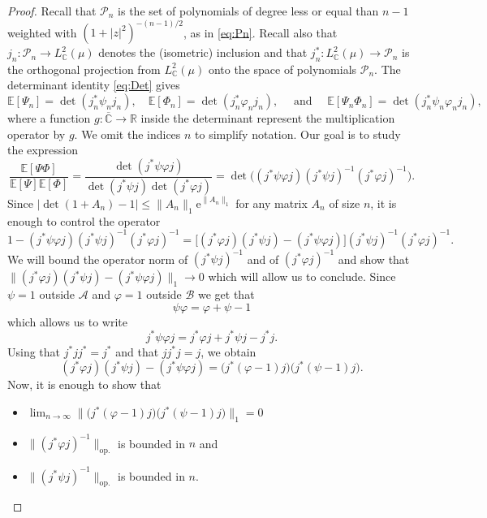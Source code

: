\documentclass[10pt,reqno]{amsart}
\numberwithin{equation}{section}
\numberwithin{figure}{section}
\theoremstyle{plain}
\newcommand{\<}{\langle}
\renewcommand{\>}{\rangle}
\begin{document}
\begin{proof}
	
	Recall that $\mathcal P_n$ is the set
	of polynomials of degree less or equal than $n-1$ weighted
	with $(1+|z|^2)^{-(n-1)/2}$, as in \eqref{eq:Pn}.
	Recall also that
	$j_n^{}: \mathcal P_n \to L^2_{\mathbb C}(\mu)$ 
    denotes the (isometric) inclusion
    and that $j_n^*: L^2_{\mathbb C}(\mu) \to \mathcal P_n$ 
    is the orthogonal projection from $L^2_{\mathbb C}(\mu)$ onto the space of polynomials $\mathcal{P}_n$. The 
    determinant identity \eqref{eq:Det} gives
	\[\mathbb E[\Psi_n] = \det(j_n^* \psi_n j_n^{}), \quad 
	\mathbb E[\Phi_n] = \det(j_n^* \varphi_n j_n^{}),
	\quad \mbox{ and } 
	\quad 
	\mathbb E[\Psi_n \Phi_n] = \det(j_n^* \psi_n \varphi_n j_n^{}),\]
	where a function $g:\overline{\mathbb C} \to \mathbb R$ inside the determinant represent
	the multiplication operator by $g$.
	We omit the indices $n$ to simplify notation.
	Our goal is to study the expression
	\[ \frac{\mathbb E[\Psi \Phi]}{\mathbb E[\Psi] \mathbb E[\Phi]}
	=  \frac{\det(j^* \psi \varphi j)}
	{\det(j^* \psi j)
	\det(j^* \varphi j)} 
	= \det	\big( (j^* \psi \varphi j)(j^* \psi j)^{-1}(j^* \varphi j)^{-1}\big).
	\]
	Since 
	$|\det(1+A_n) - 1| \leq \|A_n\|_1 \mathrm{e}^{\|A_n\|_1}$ for any 
	matrix $A_n$ of size $n$, it is enough to control the operator
	\[1 - (j^* \psi \varphi j)(j^* \psi j)^{-1}(j^* \varphi j)^{-1}
	=\Big[
	(j^* \varphi j)
	(j^* \psi j)
	-
	(j^* \psi\varphi j)
	\Big]
	(j^* \psi j)^{-1}(j^* \varphi j)^{-1}.
	\]
	We will bound the operator norm of 
	$(j^* \psi j)^{-1}$ and of $(j^* \varphi j)^{-1}$
	and show that
	$\|(j^* \varphi j)
	(j^* \psi j)
	-
	(j^* \psi\varphi j)\|_1 \to 0$ which will allow us to conclude.
	Since $\psi = 1$ outside $\mathcal{A}$ and $\varphi = 1$ outside $\mathcal B$
	we get that
	\[\psi\varphi = \varphi + \psi - 1\]
	which allows us to write
	\[j^*  \psi\varphi j = j^* \varphi j + 
	j^* \psi j - j^* j.\]
	Using that $j^* j j^* = j^*$ and that $j j^* j = j$, we obtain
	\[(j^* \varphi j)(j^* \psi j) - 
	(j^* \psi\varphi j) 
	= \big( j^* (\varphi  - 1) j\big)
	\big( j^* (\psi  - 1) j\big).\]
	Now, it is enough to show that
	\begin{itemize}
		\item $\lim_{n \to \infty} \big\|\big( j^* (\varphi  - 1) j\big)
		\big( j^* (\psi  - 1) j\big) \big\|_1  = 0  $
		\item $\|(j^* \varphi j)^{-1}\|_{\mathrm{op.}} $ is bounded in $n$ and
		\item $\|(j^* \psi j)^{-1}\|_{\mathrm{op.}} $ is bounded in $n$.

\end{itemize}
\end{proof}
\end{document}
